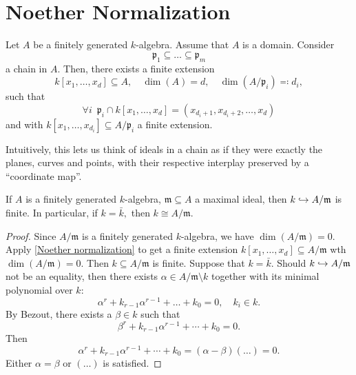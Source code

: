 \section{Noether Normalization}

\begin{theorem}
  \label{Noether normalization}
  Let \(A\) be a finitely generated \(k\)-algebra. Assume that \(A\) is a domain.
  Consider
  \[\mathfrak p_1 \subseteq \dotsc \subseteq \mathfrak p_m\]
  a chain in \(A.\)
  Then, there exists a finite extension
  \[k[x_1, \dotsc, x_d] \subseteq A, \quad \dim(A) = d, \quad \dim(A/{\mathfrak p_i}) \eqqcolon d_i,\]
  such that
  \[\forall i \enspace \mathfrak p_i \cap k[x_1, \dotsc, x_d] = (x_{d_i+1}, x_{d_i+2}, \dotsc, x_d)\]
  and with
  \(k[x_1, \dotsc, x_{d_i}] \subseteq A/{\mathfrak p_i}\)
  a finite extension.
\end{theorem}

Intuitively, this lets us think of ideals in a chain as if they were exactly the planes, curves and points, with their respective interplay preserved by a ``coordinate map''.

\begin{corollary}
  \label{weak Nullstellensatz}
  If \(A\) is a finitely generated \(k\)-algebra, \(\mathfrak m \subseteq A\) a maximal ideal, then
  \(k \hookrightarrow A/{\mathfrak m}\)
  is finite.
  In particular, if \(k = \bar k,\) then \(k \cong A/{\mathfrak m}.\)
\end{corollary}
\begin{proof}
  Since \(A/{\mathfrak m}\) is a finitely generated \(k\)-algebra, we have
  \(\dim(A/{\mathfrak m}) = 0.\)
  Apply \cref{Noether normalization} to get a finite extension
  \(k[x_1, \dotsc, x_d] \subseteq A/{\mathfrak m}\)
  wth \(\dim(A/{\mathfrak m}) = 0.\)
  Then
  \(k \subseteq A/{\mathfrak m}\)
  is finite.
  Suppose that \(k = \bar k.\) Should \(k \hookrightarrow A/{\mathfrak m}\) not be an equality, then there exists
  \(\alpha \in A/{\mathfrak m} \setminus k\)
  together with its minimal polynomial over \(k:\)
  \[\alpha^r + k_{r-1} \alpha^{r-1} + \dotsc + k_0 = 0, \quad k_i \in k.\]
  By Bezout, there exists a \(\beta \in k\) such that
  \[\beta^r + k_{r-1} \alpha^{r-1} + \dotsb + k_0 = 0.\]
  Then
  \[ \alpha^r + k_{r-1} \alpha^{r-1} + \dotsb + k_0 = (\alpha - \beta)(\dotso) = 0.\]
  Either \(\alpha = \beta\) or \((\dotso)\) is satisfied.
\end{proof}


